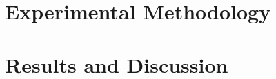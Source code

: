 ~\label{chapter:case-studies}

\section{Experimental Methodology}


\section{Results and Discussion}



